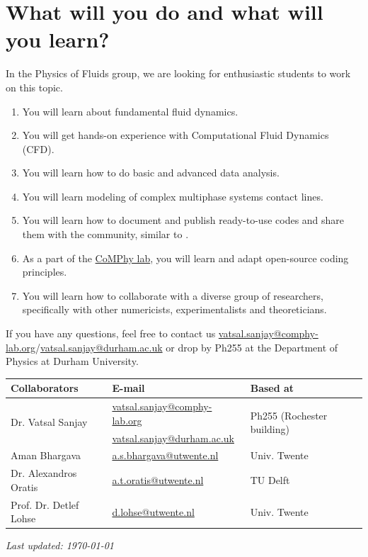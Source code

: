 \documentclass[11pt]{article}
\begin{document}
\section*{What will you do and what will you learn?}
In the Physics of Fluids group, we are looking for enthusiastic students to work on this topic.
\begin{enumerate}
\itemsep0em
\item You will learn about fundamental fluid dynamics.
\item You will get hands-on experience with Computational Fluid Dynamics (CFD).
\item You will learn how to do basic and advanced data analysis.
\item You will learn modeling of complex multiphase systems contact lines. 
\item You will learn how to document and publish ready-to-use codes and share them with the community, similar to \citet{basiliskVatsal, basiliskVatsalDropFilm, basiliskVatsalViscousBouncing}. 
\item As a part of the \href{https://comphy-lab.org}{CoMPhy lab}, you will learn and adapt open-source coding principles. 
\item You will learn how to collaborate with a diverse group of researchers, specifically with other numericists, experimentalists and theoreticians.
\end{enumerate}

If you have any questions, feel free to contact us \href{mailto:vatsal.sanjay@comphy-lab.org}{vatsal.sanjay@comphy-lab.org}/\href{mailto:vatsal.sanjay@durham.ac.uk}{vatsal.sanjay@durham.ac.uk} or drop by Ph255 at the Department of Physics at Durham University.
\begin{center}
\begin{tabular}{|l|l|l|}
\hline \textbf{Collaborators} & \textbf{E-mail} & \textbf{Based at} \\
\hline \multirow{2}{*}{Dr. Vatsal Sanjay} & \href{mailto:vatsal.sanjay@comphy-lab.org}{vatsal.sanjay@comphy-lab.org} & \multirow{2}{*}{Ph255 (Rochester building)} \\
& \href{mailto:vatsal.sanjay@durham.ac.uk}{vatsal.sanjay@durham.ac.uk} & \\
\hline Aman Bhargava & \href{mailto:a.s.bhargava@utwente.nl}{a.s.bhargava@utwente.nl} & Univ. Twente \\
\hline Dr. Alexandros Oratis   & \href{mailto:a.t.oratis@utwente.nl}{a.t.oratis@utwente.nl}& TU Delft \\
\hline Prof. Dr. Detlef Lohse & \href{mailto:d.lohse@utwente.nl}{d.lohse@utwente.nl} & Univ. Twente  \\
\hline
\end{tabular}
\end{center}

\vspace{1em}
\noindent\textit{Last updated: \today}

\printbibliography
\end{document}
